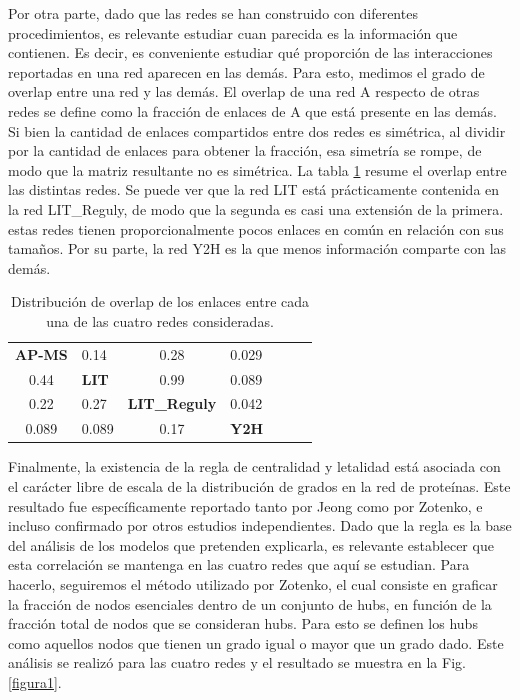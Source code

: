 \documentclass[%
 reprint,
 amsmath,amssymb,
 aps,
]{revtex4-1}
\begin{document}
Por otra parte, dado que las redes se han construido con diferentes procedimientos, es relevante estudiar cuan parecida es la informaci\'on que contienen. Es decir, es conveniente estudiar qu\'e proporci\'on de las interacciones reportadas en una red aparecen en las dem\'as. Para esto, medimos el grado de overlap entre una red y las dem\'as. El overlap de una red A respecto de otras redes se define como la fracci\'on de enlaces de A que est\'a presente en las dem\'as.  Si bien la cantidad de enlaces compartidos entre dos redes es sim\'etrica, al dividir por la cantidad de enlaces para obtener la fracci\'on, esa simetr\'ia se rompe, de modo que la matriz resultante no es sim\'etrica. La tabla \ref{tabla2} resume el overlap entre las distintas redes. Se puede ver que la red LIT est\'a pr\'acticamente contenida en la red LIT\_Reguly, de modo que la segunda es casi una extensi\'on de la primera. estas redes tienen proporcionalmente pocos enlaces en com\'un en relaci\'on con sus tama\~nos. Por su parte, la red Y2H es la que menos informaci\'on comparte con las dem\'as. 

\begin{table}[h]
\begin{ruledtabular}

\begin{tabular}{ c l c l c l c }
 {\bf AP-MS} & {0.14} & {0.28} & {0.029}\\
 {0.44} & {\bf LIT} & {0.99} & {0.089}\\
{0.22} & {0.27} & {\bf LIT\_Reguly} & {0.042}\\
 {0.089} & {0.089} & {0.17} & {\bf Y2H}\\
\end{tabular}
\end{ruledtabular}
\label{tabla2}
\caption{Distribuci\'on de overlap de los enlaces entre cada una de las cuatro redes consideradas.}
\end{table}

Finalmente, la existencia de la regla de centralidad y letalidad est\'a asociada con el car\'acter libre de escala de la distribuci\'on de grados en la red de prote\'inas. Este resultado fue espec\'ificamente reportado tanto por Jeong como por Zotenko, e incluso confirmado por otros estudios independientes. Dado que la regla es la base del an\'alisis de los modelos que pretenden explicarla, es relevante establecer que esta correlaci\'on se mantenga en las cuatro redes que aqu\'i se estudian. Para hacerlo, seguiremos el m\'etodo utilizado por Zotenko, el cual consiste en graficar la fracci\'on de nodos esenciales dentro de un conjunto de hubs, en funci\'on de la fracci\'on total de nodos que se consideran hubs. Para esto se definen los hubs como aquellos nodos que tienen un grado igual o mayor que un grado dado. Este an\'alisis se realiz\'o para las cuatro redes y el resultado se muestra en la Fig. \ref{figura1}. 
\end{document}
